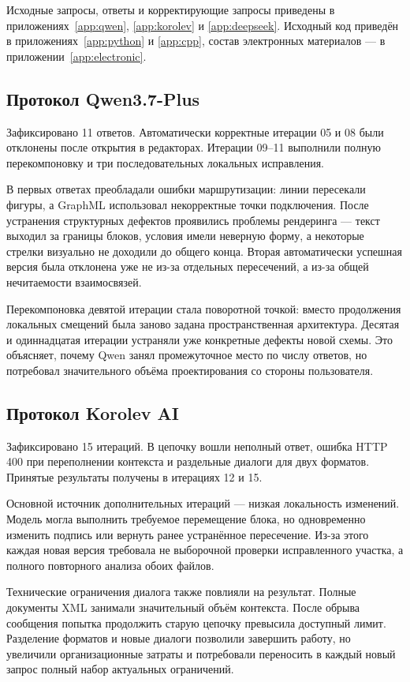 \documentclass[a4paper,12pt]{extreport}
\begin{document}
Исходные запросы, ответы и корректирующие запросы приведены в приложениях~\ref{app:qwen}, \ref{app:korolev} и \ref{app:deepseek}. Исходный код приведён в приложениях~\ref{app:python} и \ref{app:cpp}, состав электронных материалов --- в приложении~\ref{app:electronic}.

\subsection{Протокол Qwen3.7-Plus}

Зафиксировано 11 ответов. Автоматически корректные итерации 05 и 08 были отклонены после открытия в редакторах. Итерации 09--11 выполнили полную перекомпоновку и три последовательных локальных исправления.

В первых ответах преобладали ошибки маршрутизации: линии пересекали фигуры, а GraphML использовал некорректные точки подключения. После устранения структурных дефектов проявились проблемы рендеринга --- текст выходил за границы блоков, условия имели неверную форму, а некоторые стрелки визуально не доходили до общего конца. Вторая автоматически успешная версия была отклонена уже не из-за отдельных пересечений, а из-за общей нечитаемости взаимосвязей.

Перекомпоновка девятой итерации стала поворотной точкой: вместо продолжения локальных смещений была заново задана пространственная архитектура. Десятая и одиннадцатая итерации устраняли уже конкретные дефекты новой схемы. Это объясняет, почему Qwen занял промежуточное место по числу ответов, но потребовал значительного объёма проектирования со стороны пользователя.

\subsection{Протокол Korolev AI}

Зафиксировано 15 итераций. В цепочку вошли неполный ответ, ошибка HTTP 400 при переполнении контекста и раздельные диалоги для двух форматов. Принятые результаты получены в итерациях 12 и 15.

Основной источник дополнительных итераций --- низкая локальность изменений. Модель могла выполнить требуемое перемещение блока, но одновременно изменить подпись или вернуть ранее устранённое пересечение. Из-за этого каждая новая версия требовала не выборочной проверки исправленного участка, а полного повторного анализа обоих файлов.

Технические ограничения диалога также повлияли на результат. Полные документы XML занимали значительный объём контекста. После обрыва сообщения попытка продолжить старую цепочку превысила доступный лимит. Разделение форматов и новые диалоги позволили завершить работу, но увеличили организационные затраты и потребовали переносить в каждый новый запрос полный набор актуальных ограничений.
\end{document}
